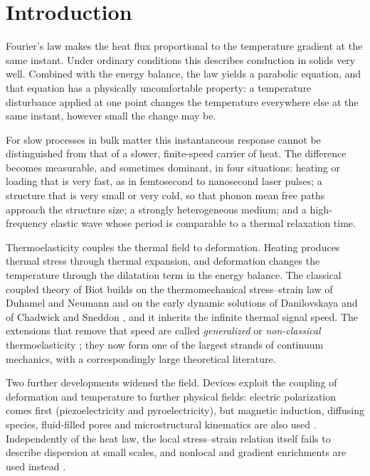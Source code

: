 \section{Introduction}\label{sec:intro}
Fourier's law makes the heat flux proportional to the temperature gradient at the same instant. Under ordinary conditions this describes conduction in solids very well. Combined with the energy balance, the law yields a parabolic equation, and that equation has a physically uncomfortable property: a temperature disturbance applied at one point changes the temperature everywhere else at the same instant, however small the change may be.

For slow processes in bulk matter this instantaneous response cannot be distinguished from that of a slower, finite-speed carrier of heat. The difference becomes measurable, and sometimes dominant, in four situations: heating or loading that is very fast, as in femtosecond to nanosecond laser pulses; a structure that is very small or very cold, so that phonon mean free paths approach the structure size; a strongly heterogeneous medium; and a high-frequency elastic wave whose period is comparable to a thermal relaxation time.

Thermoelasticity couples the thermal field to deformation. Heating produces thermal stress through thermal expansion, and deformation changes the temperature through the dilatation term in the energy balance. The classical coupled theory of Biot \citep{Biot1956} builds on the thermomechanical stress--strain law of Duhamel and Neumann \citep{Duhamel1837} and on the early dynamic solutions of Danilovskaya \citep{Danilovskaya1950} and of Chadwick and Sneddon \citep{ChadwickSneddon1958,Chadwick1960}, and it inherits the infinite thermal signal speed. The extensions that remove that speed are called \emph{generalized} or \emph{non-classical} thermoelasticity \citep{Chandrasekharaiah1986,Chandrasekharaiah1998,HetnarskiIgnaczak1999,HetnarskiIgnaczak2000,IgnaczakOstoja2010}; they now form one of the largest strands of continuum mechanics, with a correspondingly large theoretical literature.

Two further developments widened the field. Devices exploit the coupling of deformation and temperature to further physical fields: electric polarization comes first (piezoelectricity and pyroelectricity), but magnetic induction, diffusing species, fluid-filled pores and microstructural kinematics are also used \citep{Mindlin1974Thermopiezo,Nowacki1978,Eringen1999,Iesan2004}. Independently of the heat law, the local stress--strain relation itself fails to describe dispersion at small scales, and nonlocal and gradient enrichments are used instead \citep{Eringen1972,Eringen1983,Aifantis1992,Askes2011}.

